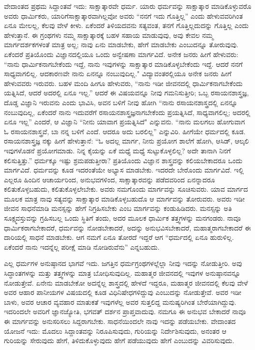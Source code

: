 ವೇದಾಂತದ ಪ್ರಥಮ ಸಿದ್ದಾಂತವೆ ಇದು: ಸಾಕ್ಷಾತ್ಕಾರವೇ ಧರ್ಮ. ಯಾರು ಧರ್ಮವನ್ನು ಸಾಕ್ಷಾತ್ಕಾರ ಮಾಡಿಕೊಳ್ಳುವರೊ ಅವರು ಧಾರ್ಮಿಕರು, ಯಾರಿಗೆ\break ಸಾಕ್ಷಾತ್ಕಾರವಾಗಿಲ್ಲವೋ ಅವರು “ನನಗೆ ಇದು ಗೊತ್ತಿಲ್ಲ” ಎಂದು ಹೇಳುವವರಿಗಿಂತ ಏನೂ ಮೇಲಲ್ಲ, ಕೆಲವು ವೇಳೆ ಕೀಳು. ಏಕೆಂದರೆ ತಿಳಿಯದವನು ಸತ್ಯವಂತ, ತನಗೆ ಗೊತ್ತಿಲ್ಲದುದನ್ನು ಗೊತ್ತಿಲ್ಲ ಎಂದು ಹೇಳುತ್ತಾನೆ. ಈ ಗ್ರಂಥಗಳು ನಮ್ಮ ಸಾಕ್ಷಾತ್ಕಾರಕ್ಕೆ ಬಹಳ ಸಹಾಯ ಮಾಡುವುವು, ಅವು ಕೇವಲ ನಮ್ಮ ಮಾರ್ಗದರ್ಶಕಗಳಂತೆ ಮಾತ್ರ ಅಲ್ಲ; ನಾವು ಏನು ಮಾಡಬೇಕು, ಹೇಗೆ ಮಾಡಬೇಕು ಎಂಬುದನ್ನೂ ತೋರುವುವು. ಏಕೆಂದರೆ ಪ್ರತಿಯೊಂದು ವಿಜ್ಞಾನದಲ್ಲಿಯೂ ಒಂದು ಅನ್ವೇಷಣಾ ಮಾರ್ಗವಿದೆ. ಅನೇಕ ಜನರು ಹೀಗೆ ಹೇಳುವರು: “ನಾನು ಧಾರ್ಮಿಕನಾಗಬೇಕೆಂದು ಇದ್ದೆ, ನಾನು ಇವುಗಳನ್ನು ಸಾಕ್ಷಾತ್ಕಾರ ಮಾಡಿಕೊಳ್ಳಬೇಕೆಂದು ಇದ್ದೆ. ಆದರೆ ನನಗೆ ಸಾಧ್ಯವಾಗಲಿಲ್ಲ. ಆದಕಾರಣವೇ ನಾನು ಏನನ್ನೂ ನಂಬುವುದಿಲ್ಲ." ವಿದ್ಯಾವಂತರಲ್ಲಿಯೂ ಅನೇಕ ಜನರು ಹೀಗೆ ಹೇಳುವವರು ಇರುವರು. ಬಹಳ ಮಂದಿ ಹೀಗೂ ಹೇಳುವರು, “ನಾನು ಇಡೀ ಜೀವನದಲ್ಲಿ ಧಾರ್ಮಿಕನಾಗಬೇಕೆಂದು ಯತ್ನಿಸಿದೆ, ಆದರೆ ಅದರಲ್ಲಿ ಏನೂ ಇಲ್ಲ.” ಆದರೆ ಈ ವಿಷಯವನ್ನೂ ನೀವು ಗಮನಿಸುತ್ತೀರಿ; ಒಬ್ಬ ರಸಾಯನಶಾಸ್ತ್ರಜ್ಞ, ದೊಡ್ಡ ವಿಜ್ಞಾನಿ ಇರುವನು ಎಂದು ಭಾವಿಸಿ, ಅವನ ಬಳಿಗೆ ನೀವು ಹೋಗಿ “ನಾನು ರಸಾಯನಶಾಸ್ತ್ರದಲ್ಲಿ ಏನನ್ನೂ ನಂಬುವುದಿಲ್ಲ, ಏಕೆಂದರೆ ನಾನು ಇದುವರೆಗೆ ರಸಾಯನಶಾಸ್ತ್ರಜ್ಞನಾಗಬೇಕೆಂದು ಪ್ರಯತ್ನಿಸಿದೆ, ಸಾಧ್ಯವಾಗಲಿಲ್ಲ; ಅದರಲ್ಲಿ ಏನೂ ಇಲ್ಲ” ಎಂದರೆ, ಆ ವಿಜ್ಞಾನಿ “ನೀನು ಯಾವಾಗ ಪ್ರಯತ್ನಿಸಿದೆ" ಎನ್ನುವನು. “ನಾನು ಮಲಗಲು ಹೋಗುವಾಗ ಓ ರಸಾಯನಶಾಸ್ತ್ರವೆ, ಬಾ ನನ್ನ ಬಳಿಗೆ ಎಂದೆ. ಆದರೂ ಅದು ಬರಲಿಲ್ಲ” ಎನ್ನುವಿರಿ. ಹೀಗೆಯೇ ಧರ್ಮದಲ್ಲಿ ಕೂಡ. ರಸಾಯನಶಾಸ್ತ್ರಜ್ಞ ನಕ್ಕು ಹೀಗೆ ಹೇಳುತ್ತಾನೆ: “ಓ ಅದಲ್ಲ ಮಾರ್ಗ, ನೀನು ಪ್ರಯೋಗ ಶಾಲೆಗೆ ಹೋಗಿ, ಆಸಿಡ್, ಆಲ್ಕಲಿ ಇವುಗಳೊಡನೆ ಪ್ರಯೋಗಮಾಡು. ನಿನ್ನ ಕೈಯನ್ನು ಏಕೆ ಮಧ್ಯೆ ಮಧ್ಯೆ ಸುಟ್ಟುಕೊಳ್ಳಲಿಲ್ಲ? ಅದೇ ತಾನಾಗಿ ನಿನಗೆ ಕಲಿಸುತ್ತಿತ್ತು.” ಧರ್ಮಕ್ಕೂ ಇಷ್ಟು ಶ್ರಮಪಡುತ್ತೀರಾ? ಪ್ರತಿಯೊಂದು ವಿಜ್ಞಾನ ಶಾಸ್ತ್ರವನ್ನು ಕಲಿಯಬೇಕಾದರೂ ಒಂದು ಮಾರ್ಗವಿದೆ. ಧರ್ಮವನ್ನು ಕೂಡ ಇದರಂತೆಯೇ ಅಭ್ಯಾಸ ಮಾಡಬೇಕು. ಇದರದೇ ಬೇರೊಂದು ಮಾರ್ಗವಿದೆ. ಇಲ್ಲಿ ಎಲ್ಲರೂ ಹಿಂದಿನ ಆಚಾರ್ಯರಿಂದ, ಅನುಭವಗಳಿಂದ, ಸಾಕ್ಷಾತ್ಕಾರವನ್ನು ಪಡೆದವರಿಂದ ಏನನ್ನಾದರೂ ಕಲಿತುಕೊಳ್ಳಬಹುದು, ಕಲಿತುಕೊಳ್ಳಲೇಬೇಕು. ಅವರು ನಮಗೊಂದು ಮಾರ್ಗವನ್ನು ಸೂಚಿಸುವರು. ಯಾವ ಮಾರ್ಗದ ಮೂಲಕ ಮಾತ್ರ ನಾವು ಸತ್ಯವನ್ನು ಸಾಕ್ಷಾತ್ಕಾರ ಮಾಡಿಕೊಳ್ಳಬಹುದೊ ಆ ಮಾರ್ಗವನ್ನು ತೋರುವರು. ಅವರು ಇಡೀ ಜೀವನ ಸಾಧನೆಮಾಡಿ ಮನಸ್ಸನ್ನು ಹೇಗೆ ನಿಗ್ರಹಿಸಬೇಕು ಎಂಬ ಮಾರ್ಗವನ್ನು ಕಂಡುಹಿಡಿದರು. ಮನಸ್ಸನ್ನು ಅತಿ ಸೂಕ್ಷ್ಮವಸ್ತುವನ್ನು ಗ್ರಹಿಸಬಲ್ಲ ಒಂದು ಸ್ಥಿತಿಗೆ ತಂದು, ಅದರ ಮೂಲಕ ಧಾರ್ಮಿಕ ತತ್ತ್ವಗಳನ್ನು ಮನಗಂಡರು. ನಾವೂ ಧಾರ್ಮಿಕರಾಗಬೇಕಾದರೆ, ಧರ್ಮವನ್ನು ನೋಡಬೇಕಾದರೆ, ಅದನ್ನು ಅನುಭವಿಸಬೇಕಾದರೆ, ಮಹಾತ್ಮರಾಗಬೇಕಾದರೆ ಈ ದಾರಿಯಲ್ಲಿ ಸಾಧನೆ ಮಾಡಬೇಕು. ಆಗ ನಮಗೆ ಏನೂ ತೋರದೆ ಇದ್ದರೆ ಆಗ “ಧರ್ಮದಲ್ಲಿ ಏನೂ ಹುರುಳಿಲ್ಲ. ಏಕೆಂದರೆ ನಾನು ಇದನ್ನೆಲ್ಲ ಪರೀಕ್ಷೆ ಮಾಡಿ ನೋಡಿರುವೆನು” ಎನ್ನಬಹುದು.

\newpage

ಎಲ್ಲ ಧರ್ಮಗಳ ಅನುಷ್ಠಾನದ ಭಾಗವೆ ಇದು. ಜಗತ್ತಿನ ಧರ್ಮಗ್ರಂಥಗಳಲ್ಲೆಲ್ಲಾ ನೀವು ಇದನ್ನು ನೋಡುತ್ತೀರಿ. ಅವು ಸಿದ್ಧಾಂತಗಳನ್ನು ಮತ್ತು ತತ್ತ್ವಗಳನ್ನು ಮಾತ್ರ ಬೋಧಿಸುವುದಿಲ್ಲ. ಮಹಾತ್ಮರ ಜೀವನದಲ್ಲಿ ಇವುಗಳ ಅನುಷ್ಠಾನವನ್ನೂ ನೋಡುತ್ತೇವೆ. ಏನೇನು ಮಾಡಬೇಕೋ ಅದನ್ನೆಲ್ಲ ಶಾಸ್ತ್ರದಲ್ಲಿ ಹೇಳದೆ ಇದ್ದರೂ, ಮಹಾತ್ಮರ ಜೀವನದಲ್ಲಿ ಕೆಲವು ವೇಳೆ ಅವರ ಆಹಾರ ಪಾನೀಯಗಳ ವಿಷಯದಲ್ಲಿ ಕೂಡ ವಿಧಿನಿಷೇಧಗಳಿದ್ದುವು ಎಂಬುದನ್ನು ನೋಡುತ್ತೇವೆ. ಅವರ ಇಡೀ ಬಾಳು, ಅವರ ಆಚಾರ ವ್ಯವಹಾರ ಮಾತುಕತೆ ಇವುಗಳೆಲ್ಲ ಅವರ ಸುತ್ತಲಿದ್ದ ಮನುಷ್ಯರಿಗಿಂತ ಬೇರೆಯಾಗಿದ್ದುವು. ಇದರಿಂದಲೇ ಅವರಿಗೆ ಜ್ಞಾನಜ್ಯೋತಿ, ಭಗವತ್ ದರ್ಶನ ಪ್ರಾಪ್ತವಾದುವು. ನಮಗೂ ಈ ಅನುಭವ ಬೇಕಾದರೆ ನಾವೂ ಈ ಮಾರ್ಗವನ್ನು ಅನುಸರಿಸಲು ಸಿದ್ದರಾಗಬೇಕು. ಸಾಧನೆಯಿಂದಲೇ ನಾವು ಇದನ್ನು ಪಡೆಯಬೇಕು. ವೇದಾಂತದ ಯೋಜನೆ ಇದು: ಮೊದಲು ಸಿದ್ದಾಂತವನ್ನು ನಿರೂಪಿಸುವುದು, ಗುರಿಯನ್ನು ನಿರ್ದೇಶಿಸುವುದು, ಅನಂತರ ಆ ಗುರಿಯನ್ನು ಸೇರುವುದು ಹೇಗೆ, ತಿಳಿದುಕೊಳ್ಳುವುದು ಹೇಗೆ ಪಡೆಯುವುದು ಹೇಗೆ ಎಂಬುದನ್ನು ವಿವರಿಸುವುದು.

